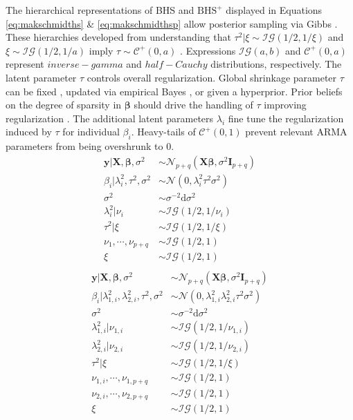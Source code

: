 The hierarchical representations of BHS and $\textrm{BHS}^+$ displayed in Equations \ref{eq:makschmidths} \& \ref{eq:makschmidthsp} allow posterior sampling via Gibbs \citep{Makalic2016b}. These hierarchies developed from understanding that $\tau^2|\xi \sim \mathcal{IG}(1/2,1/\xi)$ and $\xi\sim\mathcal{IG}(1/2,1/a)$ imply $\tau\sim\mathcal{C}^+(0,a)$ \citep{Wand2011}. Expressions $\mathcal{IG}(a,b)$ and $\mathcal{C}^+(0,a)$ represent $inverse-gamma$ and $half-Cauchy$ distributions, respectively. The latent parameter $\tau$ controls overall regularization. Global shrinkage parameter $\tau$ can be fixed \citep{vanderPas2014}, updated via empirical Bayes \citep{Johnstone2004}, or given a hyperprior\citep{Carvalho2009,Carvalho2010}. Prior beliefs on the degree of sparsity in $\bm{\beta}$  should drive the handling of $\tau$ improving regularization \citep{vanderPas2014,Piironen2016}. The additional latent parameters $\lambda_i$ fine tune the regularization induced by $\tau$ for individual $\beta_i$. Heavy-tails of $\mathcal{C}^+(0,1)$ prevent relevant ARMA parameters from being overshrunk to 0.
\begin{equation}
\label{eq:makschmidths}
\begin{split}
\bm{y}|\bm{X},\bm{\beta},\sigma^2 & \sim \mathcal{N}_{p+q}(\bm{X}\bm{\beta},\sigma^2\bm{I}_{p+q}) \\
\beta_i|\lambda^2_i,\tau^2,\sigma^2 & \sim \mathcal{N}(0,\lambda^2_i\tau^2\sigma^2) \\
\sigma^2 & \sim \sigma^{-2}\textrm{d}\sigma^2 \\
\lambda^2_i|\nu_i & \sim \mathcal{IG}(1/2,1/\nu_i)\\
\tau^2|\xi & \sim \mathcal{IG}(1/2,1/\xi)\\
\nu_1,\cdots, \nu_{p+q}& \sim \mathcal{IG}(1/2,1) \\
\xi & \sim \mathcal{IG}(1/2,1) \\
\end{split}
\end{equation}
\begin{equation}
\label{eq:makschmidthsp}
\begin{split}
\bm{y}|\bm{X},\bm{\beta},\sigma^2 & \sim \mathcal{N}_{p+q}(\bm{X}\bm{\beta},\sigma^2\bm{I}_{p+q}) \\
\beta_i|\lambda^2_{1,i},\lambda^2_{2,i},\tau^2,\sigma^2 & \sim \mathcal{N}(0,\lambda^2_{1,i}\lambda^2_{2,i}\tau^2\sigma^2) \\
\sigma^2 & \sim \sigma^{-2}\textrm{d}\sigma^2 \\
\lambda^2_{1,i}|\nu_{1,i} & \sim \mathcal{IG}(1/2,1/\nu_{1,i})\\
\lambda^2_{2,i}|\nu_{2,i} & \sim \mathcal{IG}(1/2,1/\nu_{2,i})\\
\tau^2|\xi & \sim \mathcal{IG}(1/2,1/\xi)\\
\nu_{1,i},\cdots, \nu_{1,p+q} & \sim \mathcal{IG}(1/2,1) \\
\nu_{2,i},\cdots, \nu_{2,p+q} & \sim \mathcal{IG}(1/2,1) \\
\xi & \sim \mathcal{IG}(1/2,1) \\
\end{split}
\end{equation}

